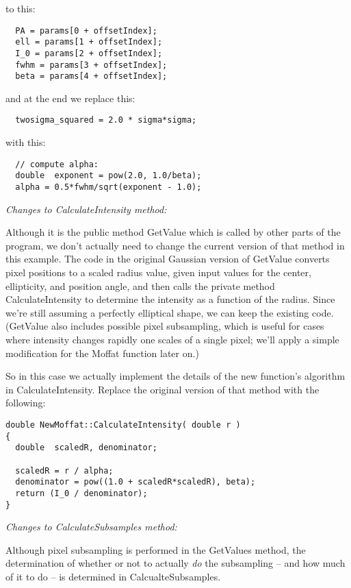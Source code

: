 \documentclass[10pt,a4paper,article]{memoir}
\begin{document}
to this:
\begin{verbatim}
  PA = params[0 + offsetIndex];
  ell = params[1 + offsetIndex];
  I_0 = params[2 + offsetIndex];
  fwhm = params[3 + offsetIndex];
  beta = params[4 + offsetIndex];
\end{verbatim}
and at the end we replace this:
\begin{verbatim}
  twosigma_squared = 2.0 * sigma*sigma;
\end{verbatim}
with this:
\begin{verbatim}
  // compute alpha:
  double  exponent = pow(2.0, 1.0/beta);
  alpha = 0.5*fwhm/sqrt(exponent - 1.0);
\end{verbatim}


\bigskip
\noindent \textit{Changes to CalculateIntensity method:}
\smallskip

Although it is the public method GetValue which is called by other parts of
the program, we don't actually need to change the current version of that method
in this example. The code in the original Gaussian version of GetValue
converts pixel positions to a scaled radius value, given input values for
the center, ellipticity, and position angle, and then calls the private method
CalculateIntensity to determine the intensity as a function of the radius.
Since we're still assuming a perfectly elliptical shape, we can keep the
existing code. (GetValue also includes possible pixel subsampling, which
is useful for cases where intensity changes rapidly one scales of a single pixel;
we'll apply a simple modification for the Moffat function later on.)

So in this case we actually implement the details of the new function's algorithm in
CalculateIntensity. Replace the original version of that method with the
following:

\begin{verbatim}
double NewMoffat::CalculateIntensity( double r )
{
  double  scaledR, denominator;
  
  scaledR = r / alpha;
  denominator = pow((1.0 + scaledR*scaledR), beta);
  return (I_0 / denominator);
}
\end{verbatim}

\bigskip
\noindent \textit{Changes to CalculateSubsamples method:}
\smallskip

Although pixel subsampling is performed in the GetValues method, the
determination of whether or not to actually \textit{do} the subsampling
-- and how much of it to do -- is determined in CalcualteSubsamples.
\end{document}
